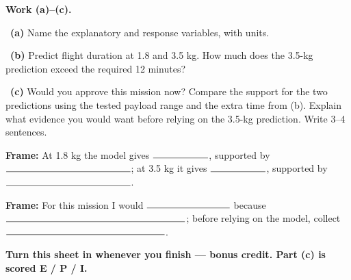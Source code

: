 \documentclass[11pt]{article}
\begin{document}
\newpage
\textbf{Work (a)--(c).}\par\smallskip

~\textbf{(a)} Name the explanatory and response variables, with units.\par
\workspace{0.65in}

~\textbf{(b)} Predict flight duration at 1.8 and 3.5 kg. How much does the 3.5-kg prediction exceed the required 12 minutes?\par
\workspace{1.35in}

~\textbf{(c)} Would you approve this mission now? Compare the support for the two predictions using the tested payload range and the extra time from (b). Explain what evidence you would want before relying on the 3.5-kg prediction. Write 3--4 sentences.\par
\workspace{1.9in}

\begin{sentenceframebox}\raggedright\textbf{Frame:} At 1.8 kg the model gives $\blank[0.8in]$, supported by $\blank[1.8in]$; at 3.5 kg it gives $\blank[0.8in]$, supported by $\blank[1.8in]$.\end{sentenceframebox}

\begin{sentenceframebox}\raggedright\textbf{Frame:} For this mission I would $\blank[1.2in]$ because $\blank[2.6in]$; before relying on the model, collect $\blank[2.3in]$.\end{sentenceframebox}

\textbf{Turn this sheet in whenever you finish --- bonus credit. Part (c) is scored E / P / I.}\par
\end{document}
